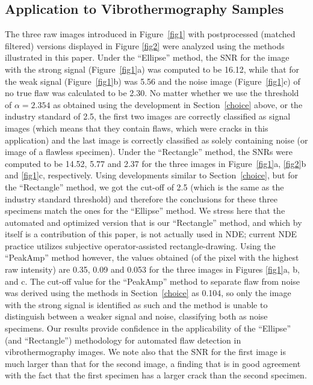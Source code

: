 \documentclass[12pt]{article}
\begin{document}
\subsection{Application to Vibrothermography Samples}
\label{application}
The three raw images introduced in Figure~\ref{fig1} with
postprocessed (matched filtered) versions displayed in Figure
\ref{fig2} were analyzed using the methods illustrated in this
paper. Under the ``Ellipse'' method, the SNR  for the image with the
strong signal (Figure~\ref{fig1}a) was computed to be 16.12, while
that for the weak 
signal (Figure~\ref{fig1}b) was 5.56 and the noise image
(Figure~\ref{fig1}c) of no true flaw was calculated to be 2.30. 
No matter whether we use the threshold of
$\alpha= 2.354$ as obtained using the development in
Section~\ref{choice} above, or the industry standard of 2.5, the first
two images are correctly classified as signal images  (which means
that they contain flaws, which were cracks in this application) and the
last image is correctly classified as solely containing
noise (or image of a flawless specimen). Under the ``Rectangle'' method,
the SNRs were computed to be 14.52, 5.77 and 2.37 for the three images
in Figure~\ref{fig1}a, \ref{fig2}b and \ref{fig1}c,
respectively. Using developments similar to 
Section~\ref{choice}, but for the ``Rectangle'' method, we got the
cut-off of 2.5 (which is the same as the industry standard threshold) and
therefore the conclusions for these three specimens match the ones
for the ``Ellipse'' method. We stress here that the automated and
optimized version that is our ``Rectangle'' method, and which by
itself is a contribution of this paper, is not actually
used in NDE; current NDE practice utilizes
subjective operator-assisted rectangle-drawing. Using  the ``PeakAmp''
method however, 
the values obtained (of the pixel with the highest raw intensity) are
0.35, 0.09 and 0.053 for the three images in Figures
\ref{fig1}a, b, and c. The cut-off value for the ``PeakAmp'' method to
separate flaw from noise was derived using the methods in
Section~\ref{choice} as 0.104, so only the image with the strong
signal is identified as such and the method is unable to
distinguish between a weaker signal and noise, classifying both as
noise specimens. Our results  provide confidence in the
applicability of the ``Ellipse'' (and ``Rectangle'') methodology for
automated flaw detection in 
vibrothermography images. We note also that the SNR for the first
image is much larger than that for the second image, a finding that is
in good agreement with the fact that the first specimen has a larger
crack than  the second specimen. 
\end{document}
